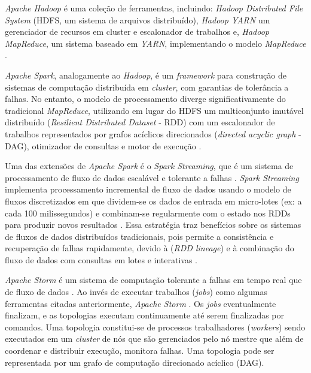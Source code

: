 \emph{Apache Hadoop} é uma coleção de ferramentas, incluindo: \emph{Hadoop
Distributed File System} (HDFS, um sistema de arquivos distribuído), \emph{Hadoop
YARN} um gerenciador de recursos em cluster e escalonador de trabalhos e,
\emph{Hadoop MapReduce}, um sistema baseado em \emph{YARN}, implementando o modelo
\emph{MapReduce} \cite{ApacheHadoop2020}.

\emph{Apache Spark}, analogamente ao \emph{Hadoop}, é um \emph{framework} para
construção de sistemas de computação distribuída em \emph{cluster}, com garantias
de tolerância a falhas.
No entanto, o modelo de processamento diverge
significativamente do tradicional \emph{MapReduce}, utilizando em lugar do HDFS
um multiconjunto imutável distribuído (\emph{Resilient Distributed Dataset}
- RDD) com um escalonador de trabalhos representados por grafos acíclicos
direcionados (\emph{directed acyclic graph} - DAG), otimizador de consultas e
motor de execução \cite{ApacheSpark2020}.

Uma das extensões de \emph{Apache Spark} é o \emph{Spark Streaming}, que é um
sistema de processamento de fluxo de dados 
escalável e tolerante a falhas
\cite{zaharia2016,sparkStreaming2016}.
\emph{Spark Streaming} implementa processamento incremental de fluxo de
dados usando o modelo de fluxos discretizados em que dividem-se os dados de entrada
em micro-lotes (ex: a cada 100 milissegundos) e combinam-se regularmente com o
estado nos RDDs para produzir novos resultados \cite{zaharia2016}.
Essa estratégia traz benefícios sobre os sistemas de fluxos de dados distribuídos
tradicionais, pois permite a consistência e recuperação de falhas rapidamente,
devido à  (\emph{RDD lineage})
e à combinação do fluxo de dados com
consultas em lotes e interativas \cite{sparkStreaming2016,Lopez2018}.

\emph{Apache Storm} é um sistema de computação tolerante a falhas em tempo
real que  de fluxo de dados
\cite{ApacheStorm2020,Lopez2018}.
Ao invés de executar trabalhos (\emph{jobs}) como algumas ferramentas citadas
anteriormente, \emph{Apache Storm} .
Os \emph{jobs} eventualmente finalizam, e as topologias executam continuamente até
serem finalizadas por comandos.
Uma topologia constitui-se de processos trabalhadores (\emph{workers}) sendo executados
em um \emph{cluster} de nós que são gerenciados pelo nó mestre que além de
coordenar e distribuir execução, monitora falhas.
Uma topologia pode ser representada por um grafo de computação direcionado
acíclico (DAG).

